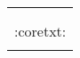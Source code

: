 \tiny{
\begin{center}
\begin{tabular}{ |p{5cm}| } 
\hline
\rowcolor{black}
\multicolumn{1}{|c|}{\nameCommand{:name:}}
\\ 
\\[0pt]
:coretxt:
\\[0pt]
\\[0pt]
\hline

\end{tabular}
\end{center}
}
